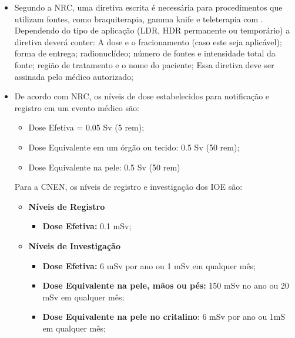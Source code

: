 \documentclass[11pt,a4paper]{article}
\newcounter{exemplo}
\begin{document}
\begin{exemplo}[Qualidade]
\begin{itemize}
        \item Segundo a NRC, uma diretiva escrita é necessária para procedimentos que utilizam fontes, como braquiterapia, gamma knife e teleterapia com . Dependendo do tipo de aplicação (LDR, HDR permanente ou temporário) a diretiva deverá conter: A dose e o fracionamento (caso este seja aplicável); forma de entrega; radionuclídeo; número de fontes e intensidade total da fonte; região de tratamento e o nome do paciente; Essa diretiva deve ser assinada pelo médico autorizado;
        
        \item De acordo com NRC, os níveis de dose estabelecidos para notificação e registro em um evento médico são:
            \begin{itemize}[label=\textcolor{CarnationPink}{$\star$}]
                \item Dose Efetiva = 0.05 Sv (5 rem);
                \item Dose Equivalente em um órgão ou tecido: 0.5 Sv (50 rem);
                \item Dose Equivalente na pele: 0.5 Sv (50 rem)
            \end{itemize}

        Para a CNEN, os níveis de registro e investigação dos IOE são:
            \begin{itemize}[label=\textcolor{CarnationPink}{$\star$}]
                \item \textbf{Níveis de Registro}
                    \begin{itemize}[label=\textcolor{CarnationPink}{$\star$}]
                        \item \textbf{Dose Efetiva:} 0.1 mSv;
                    \end{itemize}

                \item \textbf{Níveis de Investigação}
                \begin{itemize}[label=\textcolor{CarnationPink}{$\star$}]
                    \item \textbf{Dose Efetiva:} 6 mSv por ano ou 1 mSv em qualquer mês;
                    \item \textbf{Dose Equivalente na pele, mãos ou pés:} 150 mSv no ano ou 20 mSv em qualquer mês;
                    \item \textbf{Dose Equivalente na pele no critalino}: 6 mSv por ano ou 1mS em qualquer mês;
                \end{itemize}
            \end{itemize}


\end{itemize}
\end{exemplo}
\end{document}
